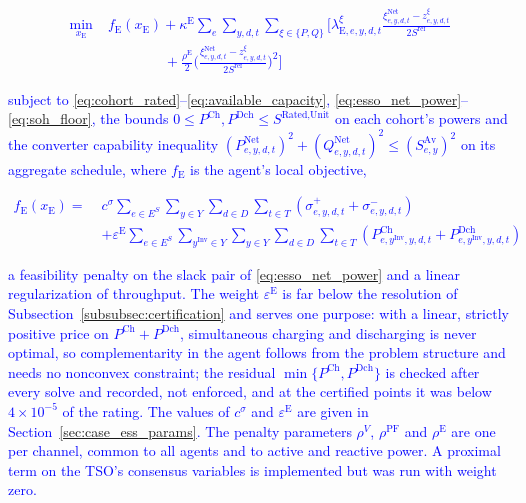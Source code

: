 \documentclass[preprint,12pt]{elsarticle}
\begin{document}
\textcolor{blue}{
    \begin{equation}
        \begin{aligned}
            \min_{x_{\text{E}}} \;
            & f_{\text{E}}(x_{\text{E}})
            + \kappa^{\text{E}} \sum_{e} \sum_{y,d,t} \sum_{\xi \in \{P,Q\}} \Big[
                \lambda^{\xi}_{\text{E},e,y,d,t} \frac{\xi^{\text{Net}}_{e,y,d,t} - z^{\xi}_{e,y,d,t}}{2 S^{\text{ref}}} \\
            & \qquad\qquad
                + \frac{\rho^{\text{E}}}{2} \Big( \frac{\xi^{\text{Net}}_{e,y,d,t} - z^{\xi}_{e,y,d,t}}{2 S^{\text{ref}}} \Big)^2
              \Big]
        \end{aligned}
        \label{eq:admm_esso_local}
    \end{equation}
}

\noindent
\textcolor{blue}{
    subject to \eqref{eq:cohort_rated}--\eqref{eq:available_capacity}, \eqref{eq:esso_net_power}--\eqref{eq:soh_floor}, the bounds $0 \le P^{\text{Ch}}, P^{\text{Dch}} \le S^{\text{Rated,Unit}}$ on each cohort's powers and the converter capability inequality $(P^{\text{Net}}_{e,y,d,t})^2 + (Q^{\text{Net}}_{e,y,d,t})^2 \le (S^{\text{Av}}_{e,y})^2$ on its aggregate schedule, where $f_{\text{E}}$ is the agent's local objective,
}

\textcolor{blue}{
    \begin{equation}
        \begin{aligned}
            f_{\text{E}}(x_{\text{E}}) = \;
            & c^{\sigma} \sum_{e \in E^S} \sum_{y \in Y} \sum_{d \in D} \sum_{t \in T}
            \left( \sigma^{+}_{e,y,d,t} + \sigma^{-}_{e,y,d,t} \right)\\
            & + \varepsilon^{\text{E}} \sum_{e \in E^S} \sum_{y^\text{Inv} \in Y} \sum_{y \in Y} \sum_{d \in D} \sum_{t \in T}
            \left( P^{\text{Ch}}_{e,y^\text{Inv},y,d,t} + P^{\text{Dch}}_{e,y^\text{Inv},y,d,t} \right)
        \end{aligned}
        \label{eq:esso_objective}
    \end{equation}
}

\noindent
\textcolor{blue}{
    a feasibility penalty on the slack pair of \eqref{eq:esso_net_power} and a linear regularization of throughput. The weight $\varepsilon^{\text{E}}$ is far below the resolution of Subsection~\ref{subsubsec:certification} and serves one purpose: with a linear, strictly positive price on $P^{\text{Ch}} + P^{\text{Dch}}$, simultaneous charging and discharging is never optimal, so complementarity in the agent follows from the problem structure and needs no nonconvex constraint; the residual $\min\{P^{\text{Ch}}, P^{\text{Dch}}\}$ is checked after every solve and recorded, not enforced, and at the certified points it was below $4 \times 10^{-5}$ of the rating. The values of $c^{\sigma}$ and $\varepsilon^{\text{E}}$ are given in Section~\ref{sec:case_ess_params}.
    The penalty parameters $\rho^{V}$, $\rho^{\text{PF}}$ and $\rho^{\text{E}}$ are one per channel, common to all agents and to active and reactive power. A proximal term on the TSO's consensus variables is implemented but was run with weight zero.
}
\end{document}
